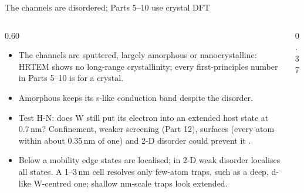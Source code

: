 \begin{frame}{The channels are disordered; Parts 5--10 use crystal DFT}
  \elevenTop\elevendense
  \begin{columns}[T,onlytextwidth]
    \begin{column}{0.60\textwidth}
      \begin{itemize}
        \item The channels are sputtered, largely amorphous or nanocrystalline: HRTEM shows no long-range
          crystallinity; every first-principles number in Parts 5--10 is for a crystal.
        \item Amorphous \InO{} keeps its s-like conduction band despite the disorder.
        \item Test H-N: does W still put its electron into an extended host state at 0.7\,nm? Confinement, weaker
          screening (Part 12), surfaces (every atom within about 0.35\,nm of one) and 2-D disorder could prevent
          it .
        \item Below a mobility edge states are localised; in 2-D weak disorder localises all
          states. A 1--3\,nm cell resolves only few-atom traps, such as a deep, d-like
          W-centred one; shallow nm-scale traps look extended.
      \end{itemize}
    \end{column}
    \begin{column}{0.37\textwidth}
      \centering
\end{column}
\end{columns}
\end{frame}

